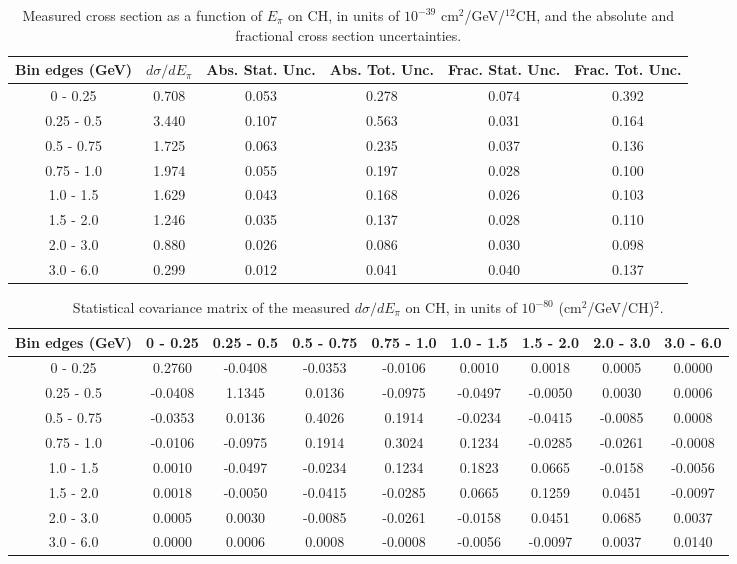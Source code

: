 \documentclass[aps,prl,twocolumn,superscriptaddress,nofootinbib]{revtex4-1}
\begin{document}
\begin{table}[h!]
  \centering
  \caption{Measured cross section as a function of $E_{\pi}$ on CH, in units of
  $10^{-39}$ $\text{cm}^{2}$/GeV/$^{12}$CH, and the absolute and
  fractional cross section uncertainties.}
    \begin{tabular}{c||c||c|c||c|c}
      Bin edges (GeV)  &  $d\sigma/dE_{\pi}$  &  Abs. Stat. Unc. & Abs. Tot. Unc.  &  Frac. Stat. Unc.  &  Frac. Tot. Unc. \\
      \hline\hline
        0 - 0.25 & 0.708 & 0.053 & 0.278 & 0.074 & 0.392 \\
      0.25 - 0.5 & 3.440 & 0.107 & 0.563 & 0.031 & 0.164 \\
      0.5 - 0.75 & 1.725 & 0.063 & 0.235 & 0.037 & 0.136 \\
      0.75 - 1.0 & 1.974 & 0.055 & 0.197 & 0.028 & 0.100 \\
       1.0 - 1.5 & 1.629 & 0.043 & 0.168 & 0.026 & 0.103 \\
       1.5 - 2.0 & 1.246 & 0.035 & 0.137 & 0.028 & 0.110 \\
       2.0 - 3.0 & 0.880 & 0.026 & 0.086 & 0.030 & 0.098 \\
       3.0 - 6.0 & 0.299 & 0.012 & 0.041 & 0.040 & 0.137 \\
    \end{tabular}
  \label{table:EpiXSec_CH}
\end{table}

\begin{table}[h!]
  \centering
  \caption{Statistical covariance matrix of the measured $d\sigma/dE_{\pi}$ on CH, in units of $10^{-80}$ (cm$^{2}$/GeV/CH)$^{2}$.}
    \begin{tabular}{c||cccccccc}
      Bin edges (GeV) & 0 - 0.25 & 0.25 - 0.5 & 0.5 - 0.75 & 0.75 - 1.0 & 1.0 - 1.5 & 1.5 - 2.0 & 2.0 - 3.0 & 3.0 - 6.0 \\
\hline \hline
        0 - 0.25 &  0.2760 & -0.0408 & -0.0353 & -0.0106 &  0.0010 &  0.0018 &  0.0005 &  0.0000 \\
      0.25 - 0.5 & -0.0408 &  1.1345 &  0.0136 & -0.0975 & -0.0497 & -0.0050 &  0.0030 &  0.0006 \\
      0.5 - 0.75 & -0.0353 &  0.0136 &  0.4026 &  0.1914 & -0.0234 & -0.0415 & -0.0085 &  0.0008 \\
      0.75 - 1.0 & -0.0106 & -0.0975 &  0.1914 &  0.3024 &  0.1234 & -0.0285 & -0.0261 & -0.0008 \\
       1.0 - 1.5 &  0.0010 & -0.0497 & -0.0234 &  0.1234 &  0.1823 &  0.0665 & -0.0158 & -0.0056 \\
       1.5 - 2.0 &  0.0018 & -0.0050 & -0.0415 & -0.0285 &  0.0665 &  0.1259 &  0.0451 & -0.0097 \\
       2.0 - 3.0 &  0.0005 &  0.0030 & -0.0085 & -0.0261 & -0.0158 &  0.0451 &  0.0685 &  0.0037 \\
       3.0 - 6.0 &  0.0000 &  0.0006 &  0.0008 & -0.0008 & -0.0056 & -0.0097 &  0.0037 &  0.0140 \\
    \end{tabular}
  \label{tablecov:CH_Statistical_Epi}
\end{table}
\end{document}
